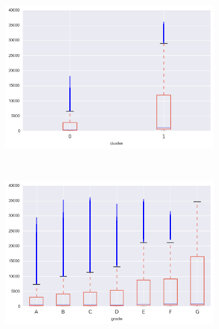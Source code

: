 \begin{apendicesenv}
\begin{figure}[t!]
\begin{subfigure}[t]{0.5\textwidth}
			\centerline{\includegraphics[width=1.05\textwidth]{img/last_pymnt_amnt_by_cluster}}
    	\end{subfigure}%
    	~ 
    	\begin{subfigure}[t]{0.5\textwidth}
    		\centering
   
			\centerline{\includegraphics[width=1.05\textwidth]{img/last_pymnt_amnt_by_grade}}

    	\end{subfigure}
\\
    	        \caption{total\textunderscore rec\textunderscore prncp }
    	\begin{subfigure}[t]{0.5\textwidth}
    		\centering


\end{subfigure}
\end{figure}
\end{apendicesenv}
